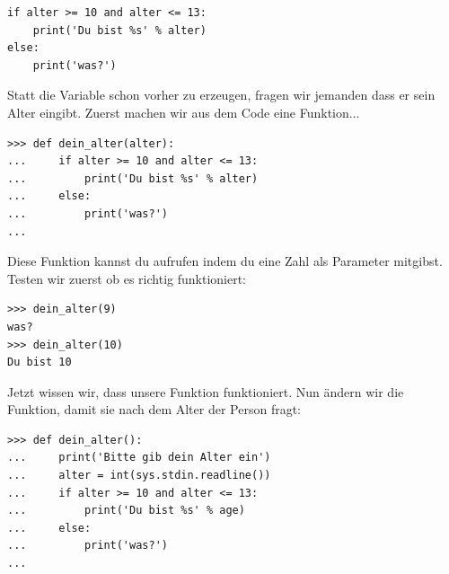 \begin{Verbatim}[frame=single]
if alter >= 10 and alter <= 13:
    print('Du bist %s' % alter)
else:
    print('was?')
\end{Verbatim}

Statt die Variable  schon vorher zu erzeugen, fragen wir jemanden dass er sein Alter eingibt. Zuerst machen wir aus dem Code eine Funktion$\ldots$

\begin{Verbatim}[frame=single]
>>> def dein_alter(alter):
...     if alter >= 10 and alter <= 13:
...         print('Du bist %s' % alter)
...     else:
...         print('was?')
...
\end{Verbatim}

Diese Funktion kannst du aufrufen indem du eine Zahl als Parameter mitgibst. Testen wir zuerst ob es richtig funktioniert:

\begin{Verbatim}[frame=single]
>>> dein_alter(9)
was?
>>> dein_alter(10)
Du bist 10
\end{Verbatim}

Jetzt wissen wir, dass unsere Funktion funktioniert. Nun ändern wir die Funktion, damit sie nach dem Alter der Person fragt:

\begin{Verbatim}[frame=single]
>>> def dein_alter():
...     print('Bitte gib dein Alter ein')
...     alter = int(sys.stdin.readline())
...     if alter >= 10 and alter <= 13:
...         print('Du bist %s' % age)
...     else:
...         print('was?')
...
\end{Verbatim}

